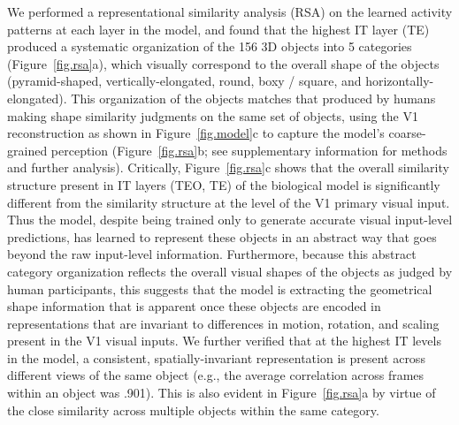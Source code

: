 \documentclass[12pt,twoside]{naturefigs}  %
\newif\myifpdf
\begin{document}
We performed a representational similarity analysis (RSA) on the learned activity patterns at each layer in the model, and found that the highest IT layer (TE) produced a systematic organization of the 156 3D objects into 5 categories (Figure~\ref{fig.rsa}a), which visually correspond to the overall shape of the objects (pyramid-shaped, vertically-elongated, round, boxy / square, and horizontally-elongated). This organization of the objects matches that produced by humans making shape similarity judgments on the same set of objects, using the V1 reconstruction as shown in Figure~\ref{fig.model}c to capture the model's coarse-grained perception (Figure~\ref{fig.rsa}b; see supplementary information for methods and further analysis).  Critically, Figure~\ref{fig.rsa}c shows that the overall similarity structure present in IT layers (TEO, TE) of the biological model is significantly different from the similarity structure at the level of the V1 primary visual input.  Thus the model, despite being trained only to generate accurate visual input-level predictions, has learned to represent these objects in an abstract way that goes beyond the raw input-level information.  Furthermore, because this abstract category organization reflects the overall visual shapes of the objects as judged by human participants, this suggests that the model is extracting the geometrical shape information that is apparent once these objects are encoded in representations that are  invariant to differences in motion, rotation, and scaling present in the V1 visual inputs.  We further verified that at the highest IT levels in the model, a consistent, spatially-invariant representation is present across different views of the same object (e.g., the average correlation across frames within an object was .901).  This is also evident in Figure~\ref{fig.rsa}a by virtue of the close similarity across multiple objects within the same category.

\end{document}
